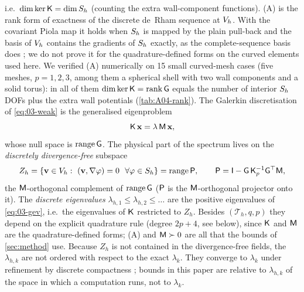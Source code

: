 i.e.\ $\dim\ker\mathsf{K}=\dim S_h$ (counting the extra wall-component functions). (A) is the rank form of exactness of the discrete de~Rham sequence at $V_h$. With the covariant Piola map it holds when $S_h$ is mapped by the plain pull-back and the basis of $V_h$ contains
the gradients of $S_h$ exactly, as the complete-sequence basis does \citep{schoberl2005high,monk2003finite,arnold2006finite}; we do not prove it for the quadrature-defined forms on the curved elements used here.
We verified (A) numerically on 15 small curved-mesh cases (five meshes, $p=1,2,3$, among them a spherical shell with two wall components and a solid torus): in all of them $\dim\ker\mathsf{K}=\operatorname{rank}\mathsf{G}$ equals the number of interior $S_h$ DOFs plus the extra wall potentials (\cref{tab:A04-rank}). %
The Galerkin discretisation of \eqref{eq:03-weak} is the generalised eigenproblem
\begin{equation}\label{eq:03-gev}
  \mathsf{K}\,\mathbf x=\lambda\,\mathsf{M}\,\mathbf x ,
\end{equation}
whose null space is $\operatorname{range}\mathsf{G}$. The physical part of the spectrum lives on the
\emph{discretely divergence-free} subspace
\begin{equation}\label{eq:03-proj}
  Z_h=\{\mathbf v\in\Vh:\ (\mathbf v,\nabla\varphi)=0\ \ \forall\varphi\in\Sh\}
  =\operatorname{range}\Pmat,\qquad
  \Pmat=\mathsf I-\Gmat\,\Kp^{-1}\Gmat^{\top}\Mmat ,
\end{equation}
the $\mathsf{M}$-orthogonal complement of $\operatorname{range}\mathsf{G}$ ($\mathsf{P}$ is the $\mathsf{M}$-orthogonal projector onto it).
The \emph{discrete eigenvalues} $\lambda_{h,1}\le\lambda_{h,2}\le\dots$ are the positive eigenvalues of \eqref{eq:03-gev}, i.e.\ the
eigenvalues of $\mathsf{K}$ restricted to $Z_h$. Besides $(\mathcal T_h,q,p)$ they depend on the explicit quadrature rule (degree $2p+4$, see below), since $\mathsf{K}$ and $\mathsf{M}$ are the quadrature-defined forms; (A) and $\mathsf{M}\succ0$ are all that the bounds of \cref{sec:method} use. Because $Z_h$ is not contained in
the divergence-free fields, the $\lambda_{h,k}$ are not ordered with respect to the exact $\lambda_k$. They converge to $\lambda_k$ under refinement by discrete compactness \citep{monk2003finite,boffi2010finite}; bounds in this paper are relative to $\lambda_{h,k}$ of the space in which a computation runs, not to $\lambda_k$.

